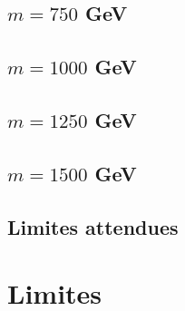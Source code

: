\documentclass[twoside,12pt]{article}
\begin{document}
\subsection{$m = 750$ GeV}


\subsection{$m = 1000$ GeV}


\subsection{$m = 1250$ GeV}


\subsection{$m = 1500$ GeV}


\subsection{Limites attendues}


\section{Limites}

\end{document}
